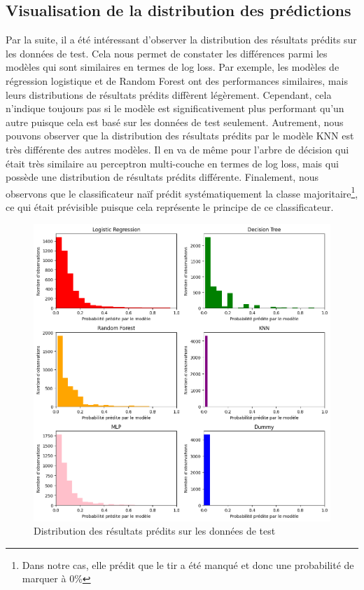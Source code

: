 \documentclass[12pt]{article}
\begin{document}
\subsection{Visualisation de la distribution des prédictions}
Par la suite, il a été intéressant d'observer la distribution des résultats prédits sur les données de test.
Cela nous permet de constater les différences parmi les modèles qui sont similaires en termes de log loss.
Par exemple, les modèles de régression logistique et de Random Forest ont des performances similaires, mais leurs distributions de résultats prédits diffèrent légèrement.
Cependant, cela n'indique toujours pas si le modèle est significativement plus performant qu'un autre puisque cela est basé sur les données de test seulement.
Autrement, nous pouvons observer que la distribution des résultats prédits par le modèle KNN est très différente des autres modèles.
Il en va de même pour l'arbre de décision qui était très similaire au perceptron multi-couche en termes de log loss, mais qui possède une distribution de résultats prédits différente.
\newline\newline
Finalement, nous observons que le classificateur naïf prédit systématiquement la classe majoritaire\footnote{Dans notre cas, elle prédit que le tir a été manqué et donc une probabilité de marquer à 0\%}, ce qui était prévisible puisque cela représente le principe de ce classificateur.
\begin{figure}[htp]
    \centering
    \includegraphics[width=\textwidth]{img/distributions_result_from_models.png}
    \caption{Distribution des résultats prédits sur les données de test}
    \label{fig:results}
\end{figure}
\end{document}
